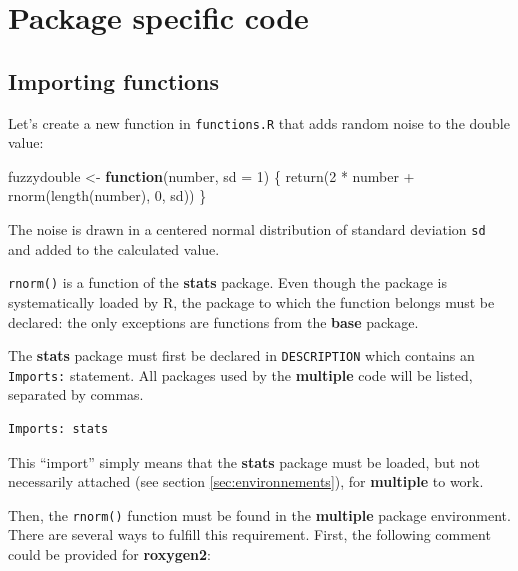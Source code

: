 \documentclass[
  12pt,
  american,
  a4paper,
  extrafontsizes,onecolumn,openright
  ]{memoir}
\newenvironment{Shaded}{\begin{snugshade}}{\end{snugshade}}
\newcommand{\AttributeTok}[1]{\textcolor[rgb]{0.77,0.63,0.00}{#1}}
\newcommand{\ControlFlowTok}[1]{\textcolor[rgb]{0.13,0.29,0.53}{\textbf{#1}}}
\newcommand{\DecValTok}[1]{\textcolor[rgb]{0.00,0.00,0.81}{#1}}
\newcommand{\FunctionTok}[1]{\textcolor[rgb]{0.00,0.00,0.00}{#1}}
\newcommand{\NormalTok}[1]{#1}
\newcommand{\OtherTok}[1]{\textcolor[rgb]{0.56,0.35,0.01}{#1}}
\newcommand{\SpecialCharTok}[1]{\textcolor[rgb]{0.00,0.00,0.00}{#1}}
\begin{document}
\hypertarget{package-specific-code}{%
\section{Package specific code}\label{package-specific-code}}

\hypertarget{importing-functions}{%
\subsection{Importing functions}\label{importing-functions}}

Let's create a new function in \texttt{functions.R} that adds random noise to the double value:

\scriptsize

\begin{Shaded}
\begin{Highlighting}[]
\NormalTok{fuzzydouble }\OtherTok{\textless{}{-}} \ControlFlowTok{function}\NormalTok{(number, }\AttributeTok{sd =} \DecValTok{1}\NormalTok{) \{}
    \FunctionTok{return}\NormalTok{(}\DecValTok{2} \SpecialCharTok{*}\NormalTok{ number }\SpecialCharTok{+} \FunctionTok{rnorm}\NormalTok{(}\FunctionTok{length}\NormalTok{(number), }\DecValTok{0}\NormalTok{, sd))}
\NormalTok{\}}
\end{Highlighting}
\end{Shaded}

\normalsize
The noise is drawn in a centered normal distribution of standard deviation \texttt{sd} and added to the calculated value.

\texttt{rnorm()} is a function of the \textbf{stats} package.
Even though the package is systematically loaded by R, the package to which the function belongs must be declared: the only exceptions are functions from the \textbf{base} package.

The \textbf{stats} package must first be declared in \texttt{DESCRIPTION} which contains an \texttt{Imports:} statement.
All packages used by the \textbf{multiple} code will be listed, separated by commas.

\begin{verbatim}
Imports: stats
\end{verbatim}

This \enquote{import} simply means that the \textbf{stats} package must be loaded, but not necessarily attached (see section \ref{sec:environnements}), for \textbf{multiple} to work.

Then, the \texttt{rnorm()} function must be found in the \textbf{multiple} package environment.
There are several ways to fulfill this requirement.
First, the following comment could be provided for \textbf{roxygen2}:
\end{document}
